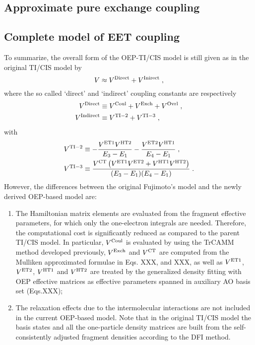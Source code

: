 \subsection{\label{s:2.3}Approximate pure exchange coupling}

\subsection{\label{s:2.4}Complete model of EET coupling}

To summarize, the overall form of the OEP-TI/CIS model is still given as in the original TI/CIS model
by
%
\begin{equation}
  V \approx V^{\rm Direct} + V^{\rm Inirect} \;,
\end{equation}
%
where the so called `direct' and `indirect' coupling constants are respectively
%
\begin{subequations}
\begin{align}
  V^{\rm Direct  } &\equiv V^{\rm Coul} + V^{\rm Exch} + V^{\rm Ovrl} \;,\\
  V^{\rm Indirect} &\equiv V^{\rm TI-2} + V^{\rm TI-3} \;,
\end{align}
\end{subequations}
%
with
%
\begin{subequations}
\begin{align}
 V^{\rm TI-2} &\equiv-\frac{V^{\rm ET1} V^{\rm HT2}}{E_3-E_1} -\frac{V^{\rm ET2} V^{\rm HT1}}{E_4-E_1}  \;,\\
 V^{\rm TI-3} &\equiv \frac{V^{\rm CT} \left( V^{\rm ET1} V^{\rm ET2} + V^{\rm HT1} V^{\rm HT2}\right) }{(E_3-E_1)(E_4-E_1)} \;.
\end{align}
\end{subequations}
%
However, 
the differences between the original Fujimoto's model and the newly derived OEP\hyp{}based model 
are: 
%
\begin{enumerate}
 \item The Hamiltonian matrix elements are evaluated from the fragment effective 
parameters, for which only the one\hyp{}electron integrals are needed. Therefore, the computational
cost is significantly reduced as compared to the parent TI/CIS model. In particular, 
$V^{\rm Coul}$ is evaluated by using the TrCAMM method developed previously,
$V^{\rm Exch}$ and $V^{\rm CT}$ are computed from the Mulliken approximated
formulae in Eqs. XXX, and XXX, as well as $V^{\rm ET1}$, $V^{\rm ET2}$,
$V^{\rm HT1}$ and $V^{\rm HT2}$ are treated by the generalized density fitting
with OEP effective matrices as effective parameters spanned in auxiliary AO basis set 
(Eqs.XXX); 
 \item The relaxation effects due to the intermolecular interactions are not included
in the current OEP\hyp{}based model.
Note that in the original TI/CIS model the basis states and all the one\hyp{}particle density matrices are built from the
self\hyp{}consistently adjusted fragment densities according to the DFI method.
\end{enumerate}
%
